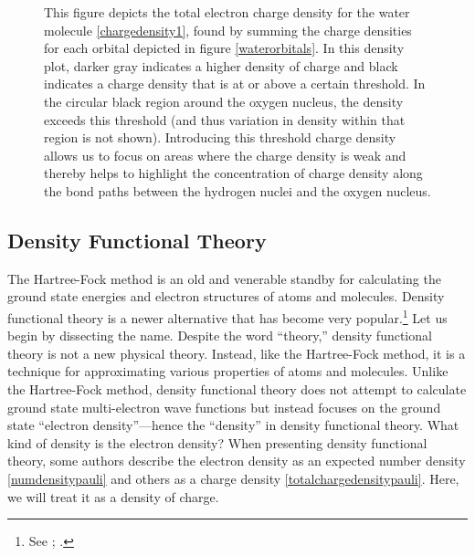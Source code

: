 \documentclass[onecolumn,secnumarabic,amsmath,amssymb,balancelastpage,nofootinbib]{article}
\begin{document}
\begin{figure}[htb]
\caption{This figure depicts the total electron charge density for the water molecule \eqref{chargedensity1}, found by summing the charge densities for each orbital depicted in figure \ref{waterorbitals}.  In this density plot, darker gray indicates a higher density of charge and black indicates a charge density that is at or above a certain threshold.  In the circular black region around the oxygen nucleus, the density exceeds this threshold (and thus variation in density within that region is not shown).  Introducing this threshold charge density allows us to focus on areas where the charge density is weak and thereby helps to highlight the concentration of charge density along the bond paths between the hydrogen nuclei and the oxygen nucleus.}
\label{water}
\end{figure}


\subsection{Density Functional Theory}\label{DFTsection}

The Hartree-Fock method is an old and venerable standby for calculating the ground state energies and electron structures of atoms and molecules.  Density functional theory is a newer alternative that has become very popular.\footnote{See \cite[pg.\ 69]{argaman2000}; \cite{becke2014}.}  Let us begin by dissecting the name.  Despite the word ``theory,'' density functional theory is not a new physical theory.  Instead, like the Hartree-Fock method, it is a technique for approximating various properties of atoms and molecules.  Unlike the Hartree-Fock method, density functional theory does not attempt to calculate ground state multi-electron wave functions but instead focuses on the ground state ``electron density''---hence the ``density'' in density functional theory.  What kind of density is the electron density?  When presenting density functional theory, some authors describe the electron density as an expected number density \eqref{numdensitypauli} and others as a charge density \eqref{totalchargedensitypauli}.  Here, we will treat it as a density of charge.
\end{document}
